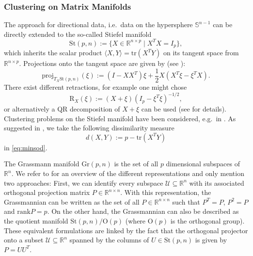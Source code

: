 \documentclass[a4paper, 12pt]{article}
\numberwithin{equation}{section}
\theoremstyle{bolddef}
\theoremstyle{definition}
\theoremstyle{boldplain}
\newcommand{\R}{\mathbb{R}}
\newcommand{\proj}{\mathrm{proj}}
\newcommand{\tr}{\mathrm{tr}}
\newcommand{\retr}{\mathrm{R}}
\begin{document}
\subsubsection{Clustering on Matrix Manifolds}

The approach for directional data, i.e.\ data on the hypersphere $\mathbb{S}^{n-1}$ can be directly extended to the so-called Stiefel manifold
\begin{equation*}
	\mathrm{St}(p, n) := \{ X \in \R^{n \times p} \mid X^T X = I_p\}, 
\end{equation*}
which inherits the scalar product $\langle X, Y \rangle = \tr( X^T Y)$ on its tangent space from $\R^{n \times p}$. Projections onto the tangent space are given by (see \cite{Absil2008}):
\begin{equation*}
	\proj_{T_X \mathrm{St}(p, n)} (\xi) := (I-XX^T) \xi + \frac{1}{2} X (X^T \xi - \xi^T X).
\end{equation*}
There exist different retractions, for example one might chose 
\begin{equation*}
	\retr_X(\xi) := (X+ \xi)(I_p - \xi^T \xi)^{-1/2},
\end{equation*}
or alternatively a QR decomposition of $X+ \xi$ can be used (see \cite{Absil2008} for details). Clustering problems on the Stiefel manifold have been considered, e.g.\ in \cite{Cetingul2009, Sengupta2017}. As suggested in \cite{Chikuse2003, Cetingul2009}, we take the following dissimilarity measure
\begin{equation*}
	d(X, Y) := p - \mathrm{tr}(X^T Y)
\end{equation*}
in \eqref{eq:minsod}.

The Grassmann manifold $\mathrm{Gr}(p, n)$ is the set of all $p$ dimensional subspaces of $\R^n$. We refer to \cite{Bendokat2024} for an overview of the different representations and only mention two approaches: First, we can identify every subspace $\mathcal{U} \subseteq \R^n$ with its associated orthogonal projection matrix $P \in \R^{n \times n}$. With this representation, the Grassmannian can be written as the set of all $P \in \R^{n \times n}$ such that $P^T = P$, $P^2 = P$ and $\mathrm{rank}P = p$. On the other hand, the Grassmannian can also be described as the quotient manifold $\mathrm{St}(p, n)/\mathrm{O}(p)$ (where $\mathrm{O}(p)$ is the orthogonal group). These equivalent formulations are linked by the fact that the orthogonal projector onto a subset $\mathcal{U} \subseteq \R^n$ spanned by the columns of $U \in \mathrm{St}(p, n)$ is given by $P=UU^T$.
\end{document}
